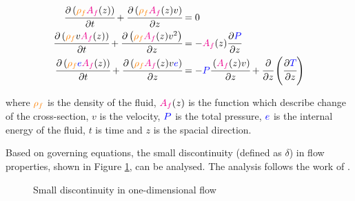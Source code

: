 \documentclass[a4paper,fleqn]{cas-dc}
\begin{document}
{\footnotesize
	\begin{align}
		\label{EQ: CompressibleEuler_1}
		\cfrac{\partial \left( {\color{orange}\rho_f} {\color{magenta}A_f}(z) \right) }{\partial t} + \cfrac{\partial \left( {\color{orange}\rho_f} {\color{magenta}A_f}(z) v \right)}{\partial z} &= 0 \\
		\cfrac{\partial \left( {\color{orange}\rho_f} v {\color{magenta}A_f}(z) \right) }{\partial t} + \cfrac{\partial \left( {\color{orange}\rho_f} {\color{magenta}A_f}(z) v^2 \right)}{\partial z} &= -{\color{magenta}A_f}(z) \cfrac{\partial {\color{blue}P}}{\partial z} \label{EQ: CompressibleEuler_2} \\
		\cfrac{\partial \left( {\color{orange}\rho_f} {\color{blue}e} {\color{magenta}A_f}(z) \right) }{\partial t} + \cfrac{\partial \left( {\color{orange}\rho_f} {\color{magenta}A_f}(z) v {\color{blue}e}\right)}{\partial z} &= -{\color{blue}P}\cfrac{\left( {\color{magenta}A_f}(z) v \right)}{\partial z} + \cfrac{\partial}{\partial z} \left( \cfrac{\partial {\color{blue}T}}{\partial z} \right)   
		\label{EQ: CompressibleEuler_3}
	\end{align}  
}

where ${\color{orange}\rho_f}$ is the density of the fluid, ${\color{magenta}A_f}(z)$ is the function which describe change of the cross-section, $v$ is the velocity, ${\color{blue}P}$ is the total pressure, ${\color{blue}e}$ is the internal energy of the fluid, $t$ is time and $z$ is the spacial direction.

Based on governing equations, the small discontinuity (defined as $\delta$) in flow properties, shown in Figure \ref{fig: Discontinuity_slow_flow}, can be analysed. The analysis follows the work of \citet{Schreier1982}.

\begin{figure}[!h]
	\centering
	\caption{Small discontinuity in one-dimensional flow}
	\label{fig: Discontinuity_slow_flow}
\end{figure} 
\end{document}
